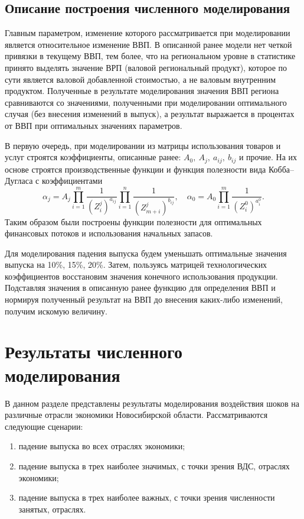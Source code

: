 \documentclass[12pt, a4paper]{article}
\begin{document}
\subsection{Описание построения численного моделирования}

Главным параметром, изменение которого рассматривается при моделировании является относительное изменение ВВП. В описанной ранее модели нет четкой привязки в текущему ВВП, тем более, что на региональном уровне в статистике принято выделять значение ВРП (валовой региональный продукт), которое по сути является валовой добавленной стоимостью, а не валовым внутренним продуктом. Полученные в результате моделирования значения ВВП региона сравниваются со значениями, полученными при моделировании оптимального случая (без внесения изменений в выпуск), а результат выражается в процентах от ВВП при оптимальных значениях параметров.

В первую очередь, при моделировании из матрицы использования товаров и услуг строятся коэффициенты, описанные ранее: $A_0,\ A_j,\ a_{ij},\ b_{ij}$ и прочие. На их основе строятся производственные функции и функция полезности вида Кобба--Дугласа с коэффициентами 
$$\alpha_j = A_j \prod\limits_{i=1}^{m} \dfrac{1}{(Z_i^j)^{a_{ij}}}\prod\limits_{i=1}^{n}\dfrac{1}{(Z_{m+i}^j)^{b_{ij}}},\quad \alpha_0 = A_0 \prod\limits_{i=1}^m\dfrac{1}{(Z_i^0)^{a_i^0}}.$$
Таким образом были построены функции полезности для оптимальных финансовых потоков и использования начальных запасов.

Для моделирования падения выпуска будем уменьшать оптимальные значения выпуска на 10\%, 15\%, 20\%. Затем, пользуясь матрицей технологических коэффициентов восстановим значения конечного использования продукции. Подставляя значения в описанную ранее функцию для определения ВВП и нормируя полученный результат на ВВП до внесения каких-либо изменений, получим искомую величину.
\section{Результаты численного моделирования}
В данном разделе представлены результаты моделирования воздействия шоков на различные отрасли экономики Новосибирской области. Рассматриваются следующие сценарии:
\begin{enumerate}
\item падение выпуска во всех отраслях экономики;
\item падение выпуска в трех наиболее значимых, с точки зрения ВДС, отраслях экономики;
\item падение выпуска в трех наиболее важных, с точки зрения численности занятых, отраслях.
\end{enumerate}
\end{document}
